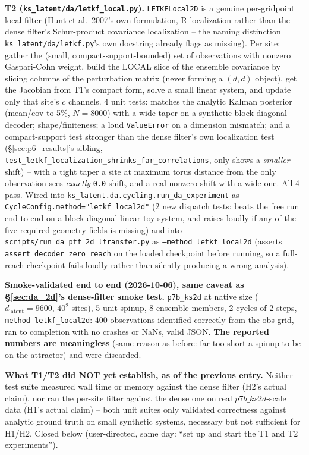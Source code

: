 \documentclass[11pt]{article}
\begin{document}
\textbf{T2 (\texttt{ks\_latent/da/letkf\_local.py}).}
\texttt{LETKFLocal2D} is a genuine per-gridpoint local filter (Hunt et
al.\ 2007's own formulation, R-localization rather than the dense
filter's Schur-product covariance localization -- the naming distinction
\texttt{ks\_latent/da/letkf.py}'s own docstring already flags as
missing). Per site: gather the (small, compact-support-bounded) set of
observations with nonzero Gaspari-Cohn weight, build the LOCAL slice of
the ensemble covariance by slicing columns of the perturbation matrix
(never forming a $(d,d)$ object), get the Jacobian from T1's compact
form, solve a small linear system, and update only that site's $c$
channels. 4 unit tests: matches the analytic Kalman posterior (mean/cov
to 5\%, $N{=}8000$) with a wide taper on a synthetic block-diagonal
decoder; shape/finiteness; a loud \texttt{ValueError} on a dimension
mismatch; and a compact-support test stronger than the dense filter's
own localization test (\S\ref{sec:p6_results}'s sibling,
\texttt{test\_letkf\_localization\_shrinks\_far\_correlations}, only
shows a \emph{smaller} shift) -- with a tight taper a site at maximum
torus distance from the only observation sees \emph{exactly} \texttt{0.0}
shift, and a real nonzero shift with a wide one. All 4 pass. Wired into
\texttt{ks\_latent.da.cycling.run\_da\_experiment} as
\texttt{CycleConfig.method="letkf\_local2d"} (2 new dispatch tests:
beats the free run end to end on a block-diagonal linear toy system, and
raises loudly if any of the five required geometry fields is missing)
and into \texttt{scripts/run\_da\_pff\_2d\_ltransfer.py} as
\texttt{--method letkf\_local2d} (asserts
\texttt{assert\_decoder\_zero\_reach} on the loaded checkpoint before
running, so a full-reach checkpoint fails loudly rather than silently
producing a wrong analysis).

\textbf{Smoke-validated end to end (2026-10-06), same caveat as
\S\ref{sec:da_2d}'s dense-filter smoke test.} \texttt{p7b\_ks2d} at
native size ($d_{\mathrm{latent}}{=}9600$, $40^2$ sites), 5-unit spinup,
8 ensemble members, 2 cycles of 2 steps, \texttt{--method
letkf\_local2d}: 400 observations identified correctly from the obs
grid, ran to completion with no crashes or NaNs, valid JSON. \textbf{The
reported numbers are meaningless} (same reason as before: far too short
a spinup to be on the attractor) and were discarded.

\textbf{What T1/T2 did NOT yet establish, as of the previous entry.}
Neither test suite measured wall time or memory against the dense
filter (H2's actual claim), nor ran the per-site filter against the
dense one on real $p7b\_ks2d$-scale data (H1's actual claim) -- both
unit suites only validated correctness against analytic ground truth on
small synthetic systems, necessary but not sufficient for H1/H2. Closed
below (user-directed, same day: ``set up and start the T1 and T2
experiments'').
\end{document}
